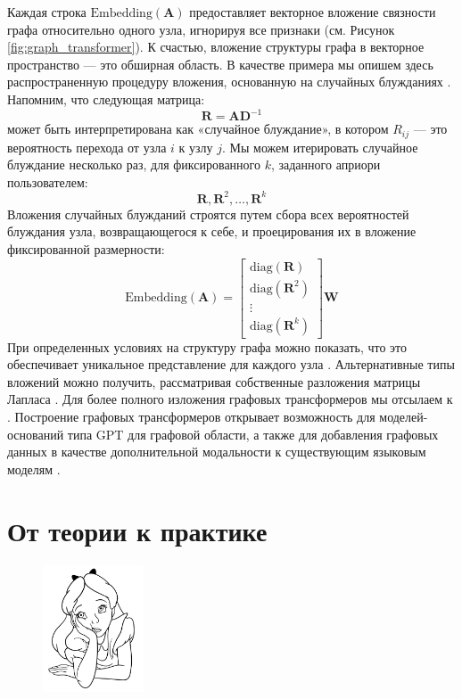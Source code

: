 Каждая строка $\text{Embedding}(\mathbf{A})$ предоставляет векторное вложение связности графа относительно одного узла, игнорируя все признаки (см. Рисунок \ref{fig:graph_transformer}). К счастью, вложение структуры графа в векторное пространство — это обширная область. В качестве примера мы опишем здесь распространенную процедуру вложения, основанную на случайных блужданиях \cite{dwivedi2021graph}. Напомним, что следующая матрица:
%
$$
\mathbf{R} =\mathbf{A}\mathbf{D}^{-1}
$$
%
может быть интерпретирована как «случайное блуждание», в котором $R_{ij}$ — это вероятность перехода от узла $i$ к узлу $j$. Мы можем итерировать случайное блуждание несколько раз, для фиксированного $k$, заданного априори пользователем:
%
$$
\mathbf{R}, \mathbf{R}^2, \ldots,\mathbf{R}^k
$$
%
Вложения случайных блужданий строятся путем сбора всех вероятностей блуждания узла, возвращающегося к себе, и проецирования их в вложение фиксированной размерности:
%
$$
\text{Embedding}(\mathbf{A})=\begin{bmatrix} \text{diag}(\mathbf{R}) \\ \text{diag}(\mathbf{R}^2) \\ \vdots \\ \text{diag}(\mathbf{R}^k)\end{bmatrix}\mathbf{W}
$$
%
При определенных условиях на структуру графа можно показать, что это обеспечивает уникальное представление для каждого узла \cite{dwivedi2021graph}. Альтернативные типы вложений можно получить, рассматривая собственные разложения матрицы Лапласа \cite{lim2022sign}. Для более полного изложения графовых трансформеров мы отсылаем к \cite{muller2023attending}. Построение графовых трансформеров открывает возможность для моделей-оснований типа GPT для графовой области, а также для добавления графовых данных в качестве дополнительной модальности к существующим языковым моделям \cite{maoposition}.

\section*{От теории к практике}

\begin{figure}
\vspace{-5em}\includegraphics[width=3.0cm]{images/shutterstock_2075221579.jpg}
\vspace{-2em}
\end{figure}

